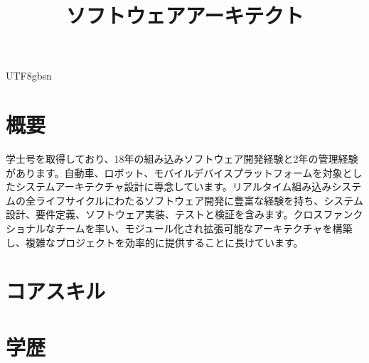 \documentclass[10pt,a4paper,mono]{moderncv}   %
\title{ソフトウェアアーキテクト}                      %
\begin{document}
\ifxetexorluatex
\else
\begin{CJK*}{UTF8}{gbsn}                          %
\fi


\maketitle

\section{概要}
学士号を取得しており、18年の組み込みソフトウェア開発経験と2年の管理経験があります。自動車、ロボット、モバイルデバイスプラットフォームを対象としたシステムアーキテクチャ設計に専念しています。リアルタイム組み込みシステムの全ライフサイクルにわたるソフトウェア開発に豊富な経験を持ち、システム設計、要件定義、ソフトウェア実装、テストと検証を含みます。クロスファンクショナルなチームを率い、モジュール化され拡張可能なアーキテクチャを構築し、複雑なプロジェクトを効率的に提供することに長けています。

\section{コアスキル}

\section{学歴}



\end{CJK*}
\end{document}
